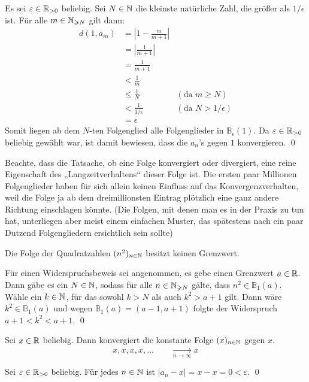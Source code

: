 \begin{bew}
Es sei $\varepsilon \in {\mathbb R}_{>0}$ beliebig. Sei $N\in {\mathbb N}$ die kleinste natürliche Zahl, die größer als $1/\epsilon$ ist. Für alle $m\in {\mathbb N}_{\geqslant N}$ gilt dann:
\begin{align*}
 d(1,a_m) & = \left| 1-\frac{m}{m+1}\right| \\
 & = \left| \frac{1}{m+1} \right| \\
 & = \frac{1}{m+1} \\
 & < \frac{1}{m} \\
 & \leq \frac{1}{N} & (\text{da $m\geq N$})\\
 & < \frac{1}{1/\epsilon} & (\text{da $N> 1/\epsilon$}) \\
 & = \epsilon
\end{align*}
Somit liegen ab dem $N$-ten Folgenglied alle Folgenglieder in $\mathbb{B}_\epsilon(1)$. Da $\varepsilon \in {\mathbb R}_{>0}$ beliebig gewählt war, ist damit bewiesen, dass die $a_n$'s gegen $1$ konvergieren. \qed
\end{bew}



\begin{bem}
 Beachte, dass die Tatsache, ob eine Folge konvergiert oder divergiert, eine reine Eigenschaft des „Langzeitverhaltens“ dieser Folge ist. Die ersten paar Millionen Folgenglieder haben für sich allein keinen Einfluss auf das Konvergenzverhalten, weil die Folge ja ab dem dreimillionsten Eintrag plötzlich eine ganz andere Richtung einschlagen könnte. (Die Folgen, mit denen man es in der Praxis zu tun hat, unterliegen aber meist einem einfachen Muster, das spätestens nach ein paar Dutzend Folgengliedern ersichtlich sein sollte)
\end{bem}




\begin{bsp}
 Die Folge der Quadratzahlen $(n^2)_{n\in {\mathbb N}}$ besitzt keinen Grenzwert.
\end{bsp}
\begin{bew}
 Für einen Widerspruchsbeweis sei angenommen, es gebe einen Grenzwert $a\in {\mathbb R}$. Dann gäbe es ein $N\in {\mathbb N}$, sodass für alle $n\in {\mathbb N}_{\geqslant N}$ gälte, dass $n^2 \in \mathbb{B}_1(a)$. Wähle ein $k\in {\mathbb N}$, für das sowohl $k>N$ als auch $k^2>a+1$ gilt. Dann wäre $k^2\in \mathbb{B}_1(a)$ und wegen $\mathbb{B}_1(a)=(a-1,a+1)$ folgte der Widerspruch $a+1 < k^2 < a+1$. \qed
\end{bew}




\begin{bsp}
 Sei $x \in {\mathbb R}$ beliebig. Dann konvergiert die konstante Folge $(x)_{n\in {\mathbb N}}$ gegen $x$.
 \[ x,x,x,x,\dots \qquad \xrightarrow[n\to \infty]{} x \]
\end{bsp}
\begin{bew}
Sei $\varepsilon \in {\mathbb R}_{>0}$ beliebig. Für jedes $n\in {\mathbb N}$ ist $\vert a_n-x\vert =x-x=0 < \varepsilon$. \qed
\end{bew}





